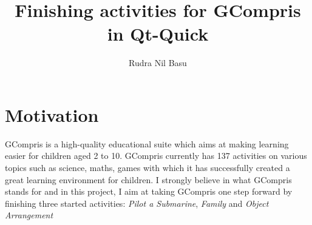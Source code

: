 \documentclass[preprint,12pt]{elsarticle}
\begin{document}
\begin{frontmatter}



\title{Finishing activities for GCompris in Qt-Quick}


\author{Rudra Nil Basu}

\address{ \textbf{Email ID}: rudra.nil.basu.1996@gmail.com}
\address{ \textbf{Freenode IRC Nick}: rudra}
\address{ \textbf{Location}: Kolkata, West Bengal, India UTC+5.30}

\end{frontmatter}


\section{Motivation}
\label{S:1}


GCompris is a high-quality educational suite which aims at making learning easier for children aged 2 to 10. GCompris currently has 137 activities on various topics such as science, maths, games with which it has successfully created a great learning environment for children. I strongly believe in what GCompris stands for and in this project, I aim at taking GCompris one step forward by finishing three started activities: \textit{Pilot a Submarine}, \textit{Family} and \textit{Object Arrangement}
\end{document}
